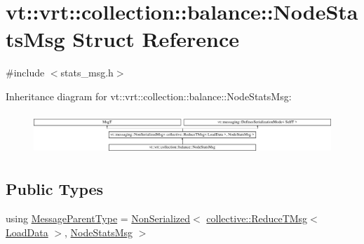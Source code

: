 \hypertarget{structvt_1_1vrt_1_1collection_1_1balance_1_1_node_stats_msg}{}\section{vt\+:\+:vrt\+:\+:collection\+:\+:balance\+:\+:Node\+Stats\+Msg Struct Reference}
\label{structvt_1_1vrt_1_1collection_1_1balance_1_1_node_stats_msg}


{\ttfamily \#include $<$stats\+\_\+msg.\+h$>$}

Inheritance diagram for vt\+:\+:vrt\+:\+:collection\+:\+:balance\+:\+:Node\+Stats\+Msg\+:\begin{figure}[H]
\begin{center}
\leavevmode
\includegraphics[height=1.584906cm]{structvt_1_1vrt_1_1collection_1_1balance_1_1_node_stats_msg}
\end{center}
\end{figure}
\subsection*{Public Types}
\begin{DoxyCompactItemize}
\item 
using \hyperlink{structvt_1_1vrt_1_1collection_1_1balance_1_1_node_stats_msg_a43e175250ef898f201a7c19e5204ba93}{Message\+Parent\+Type} = \hyperlink{namespacevt_a378e4a02213923b4ba1c3f9d2a1424c7}{Non\+Serialized}$<$ \hyperlink{namespacevt_1_1collective_a28b82d5d48c9bc6e4fd738fcbf9e0f62}{collective\+::\+Reduce\+T\+Msg}$<$ \hyperlink{structvt_1_1vrt_1_1collection_1_1balance_1_1_load_data}{Load\+Data} $>$, \hyperlink{structvt_1_1vrt_1_1collection_1_1balance_1_1_node_stats_msg}{Node\+Stats\+Msg} $>$
\end{DoxyCompactItemize}
